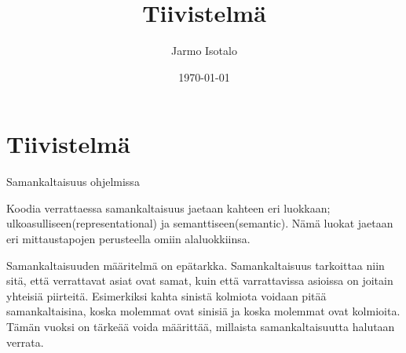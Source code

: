 \documentclass[finnish]{tktltiki2}
\title{Tiivistelmä}
\author{Jarmo Isotalo}
\date{\today}
\theoremstyle{definition}
\theoremstyle{remark}
\begin{document}

\frontmatter      %

\maketitle        %



\mainmatter       %
\section{Tiivistelmä}
Samankaltaisuus ohjelmissa

Koodia verrattaessa samankaltaisuus jaetaan kahteen eri luokkaan; ulkoasulliseen(representational) ja semanttiseen(semantic). Nämä luokat jaetaan eri mittaustapojen perusteella omiin alaluokkiinsa.

Samankaltaisuuden määritelmä on epätarkka. Samankaltaisuus tarkoittaa niin sitä, että verrattavat asiat ovat samat, kuin että varrattavissa asioissa on joitain yhteisiä piirteitä. Esimerkiksi kahta sinistä kolmiota voidaan pitää samankaltaisina, koska molemmat ovat sinisiä ja koska molemmat ovat kolmioita. Tämän vuoksi on tärkeää voida määrittää, millaista samankaltaisuutta halutaan verrata.
\end{document}

